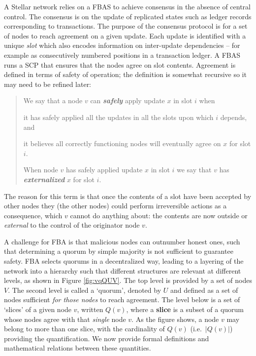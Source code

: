 A Stellar network relies on a FBAS to achieve consensus in the absence of central control. The consensus is on the update of replicated states such as ledger records corresponding to transactions. The purpose of the consensus protocol is for a set of nodes to reach agreement on a given update. Each update is identified with a unique \emph{slot} which also encodes information on inter-update dependencies -- for example as consecutively numbered positions in a transaction ledger. A FBAS runs a SCP that ensures that the nodes agree on slot contents. Agreement is defined in terms of safety of operation; the definition is somewhat recursive so it may need to be refined later:
\begin{quote}
\vspace{-0.8cm}
\small
\begin{defin}
We say that a node $v$ can \emph{\bf safely} apply update $x$ in slot $i$ when
\begin{packed_item1}
\item it has safely applied all the updates in all the slots upon which $i$ depends, and
\item it believes all correctly functioning nodes will eventually agree on $x$ for slot $i$.
\end{packed_item1}
\end{defin}
\smallskip
\begin{defin}
When node $v$ has safely applied update $x$ in slot $i$ we say that $v$ has \emph{\bf externalized} $x$ for slot $i$.
\end{defin}
\end{quote}
The reason for this term is that once the contents of a slot have been accepted by other nodes they (the other nodes) could perform irreversible actions as a consequence, which $v$ cannot do anything about: the contents are now outside or \emph{external} to the control of the originator node $v$.

A challenge for FBA is that malicious nodes can outnumber honest ones, such that determining a quorum by simple majority is not sufficient to guarantee safety. FBA selects quorums in a decentralized way, leading to a layering of the network into a hierarchy such that different structures are relevant at different levels, as shown in Figure \ref{fig:vqQUV}. The top level is provided by a set of nodes $V$. The second level is called a `quorum', denoted by $U$ and defined as a set of nodes sufficient \emph{for those nodes} to reach agreement. The level below is a set of `slices' of a given node $v$, written $Q(v)$, where a {\bf slice} is a subset of a quorum whose nodes agree with that \emph{single} node $v$. As the figure shows, a node $v$ may belong to more than one slice, with the cardinality of $Q(v)$ (i.e.\ $|Q(v)|$) providing the quantification. We now provide formal definitions and mathematical relations between these quantities.

